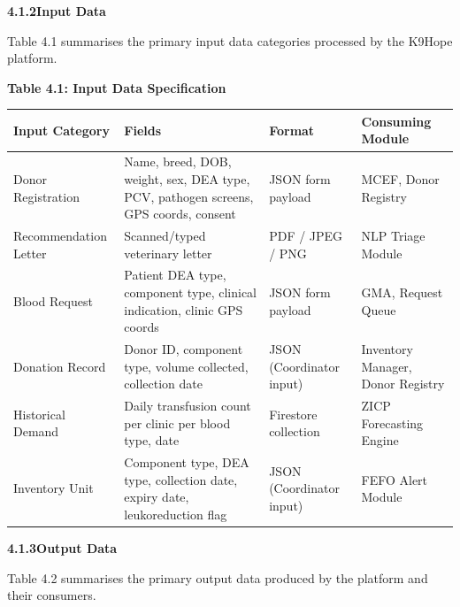 \documentclass[12pt,a4paper]{article}
\begin{document}
\vspace{1.2em}
\noindent\textbf{4.1.2\quad Input Data}
\vspace{0.5em}

\noindent Table 4.1 summarises the primary input data categories processed by the K9Hope platform.

\begin{center}
\textbf{Table 4.1: Input Data Specification}
\vspace{0.4em}
\begin{tabular}{p{3.2cm} p{4.5cm} p{2.2cm} p{3.5cm}}
\toprule
\textbf{Input Category} & \textbf{Fields} & \textbf{Format} & \textbf{Consuming Module} \\
\midrule
Donor Registration & Name, breed, DOB, weight, sex, DEA type, PCV, pathogen screens, GPS coords, consent & JSON form payload & MCEF, Donor Registry \\
\addlinespace
Recommendation Letter & Scanned/typed veterinary letter & PDF / JPEG / PNG & NLP Triage Module \\
\addlinespace
Blood Request & Patient DEA type, component type, clinical indication, clinic GPS coords & JSON form payload & GMA, Request Queue \\
\addlinespace
Donation Record & Donor ID, component type, volume collected, collection date & JSON (Coordinator input) & Inventory Manager, Donor Registry \\
\addlinespace
Historical Demand & Daily transfusion count per clinic per blood type, date & Firestore collection & ZICP Forecasting Engine \\
\addlinespace
Inventory Unit & Component type, DEA type, collection date, expiry date, leukoreduction flag & JSON (Coordinator input) & FEFO Alert Module \\
\bottomrule
\end{tabular}
\end{center}

\vspace{1.2em}
\noindent\textbf{4.1.3\quad Output Data}
\vspace{0.5em}

\noindent Table 4.2 summarises the primary output data produced by the platform and their consumers.
\end{document}
